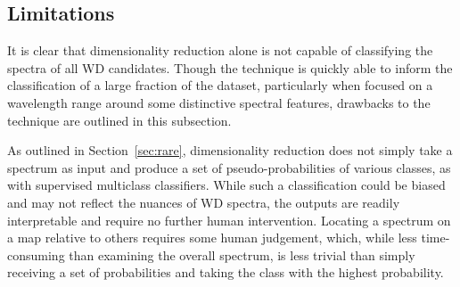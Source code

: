 \documentclass[fleqn,usenatbib]{mnras}
\begin{document}
\subsection{Limitations}

It is clear that dimensionality reduction alone is not capable of classifying the spectra of all WD candidates.
Though the technique is quickly able to inform the classification of a large fraction of the dataset, particularly when focused on a wavelength range around some distinctive spectral features, drawbacks to the technique are outlined in this subsection.

As outlined in Section~\ref{sec:rare}, dimensionality reduction does not simply take a spectrum as input and produce a set of pseudo-probabilities of various classes, as with supervised multiclass classifiers.
While such a classification could be biased and may not reflect the nuances of WD spectra, the outputs are readily interpretable and require no further human intervention.
Locating a spectrum on a map relative to others requires some human judgement, which, while less time-consuming than examining the overall spectrum, is less trivial than simply receiving a set of probabilities and taking the class with the highest probability.
\end{document}
